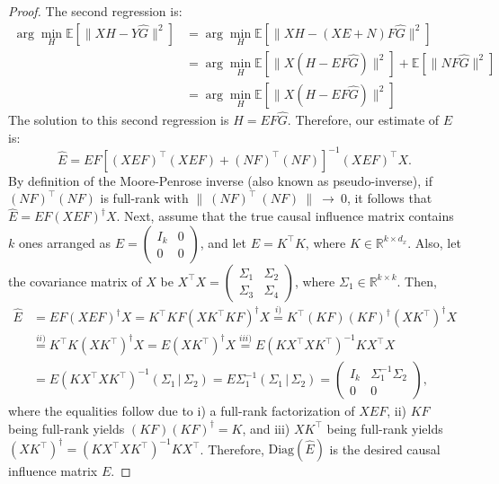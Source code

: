 \documentclass{article}
\begin{document}
\begin{proof}
The second regression is:
%
\begin{align*}
    \arg \min_H \mathbb{E}[\| XH - Y \hat{G} \|^2] &=\arg  \min_H \mathbb{E}[\| XH - (XE + N)F \hat G \|^2] \\
    &=\arg \min_H \mathbb{E}[\| X(H - EF \hat G) \| ^2] + \mathbb{E}[\| NF\hat G \| ^2]\\
    &= \arg \min_H \mathbb{E}[\| X(H - EF \hat G) \| ^2]
\end{align*}
%
The solution to this second regression is $H = EF\hat{G}$.
%
Therefore, our estimate of $E$ is:
\begin{equation}
    \hat{E} = EF[(XEF)^\top (XEF) + (NF)^\top (NF)]^{-1} (XEF)^\top X.
    \label{eq:estimate}
\end{equation}
%
By definition of the Moore-Penrose inverse (also known as pseudo-inverse), if $(NF)^\top (NF)$ is full-rank with $\|~(NF)^\top~(NF)~\|~\to~0$, it follows that $\hat{E} = EF(XEF)^\dagger X$.
%
Next, assume that the true causal influence matrix contains $k$ ones arranged as $E = \left(\begin{array}{cc} I_k & 0 \\ 0 & 0 \end{array}\right)$, and let $E = K^\top K$, where $K\in \mathbb{R}^{k \times d_x}$.
%
    Also, let the covariance matrix of $X$ be $X^\top X = \left(\begin{array}{cc}\Sigma_{1} & \Sigma_{2} \\ \Sigma_{3} & \Sigma_{4}\end{array}\right)$, where $\Sigma_1 \in \mathbb{R}^{k\times k}$.
%
Then,
\begin{align*}
    \hat{E} &= EF(XEF)^\dagger X = K^\top K F(XK^\top K F)^\dagger X \stackrel{i)}{=} K^\top (K F) (KF)^\dagger (XK^\top)^\dagger X\\
            &\stackrel{ii)}{=} K^\top K(XK^\top)^\dagger X = E (XK^\top)^\dagger X \stackrel{iii)}{=} E (KX^\top X K^\top)^{-1} KX^\top X\\
            &= E (KX^\top X K^\top)^{-1} (\Sigma_1 \,|\, \Sigma_2)  = E \Sigma_1^{-1} (\Sigma_1 \,|\, \Sigma_2)
            = \left(\begin{array}{cc} I_k & \Sigma_1^{-1} \Sigma_2 \\ 0 & 0 \end{array}\right),
\end{align*}
where the equalities follow due to i) a full-rank factorization of $XEF$, ii) $KF$ being full-rank yields $(KF)(KF)^\dagger = K$, and iii) $X K^\top$ being full-rank yields $(XK^\top)^\dagger = (KX^\top X K^\top)^{-1} KX^\top$.
%
Therefore, $\text{Diag}(\hat{E})$ is the desired causal influence matrix $E$.
\end{proof}
\end{document}
